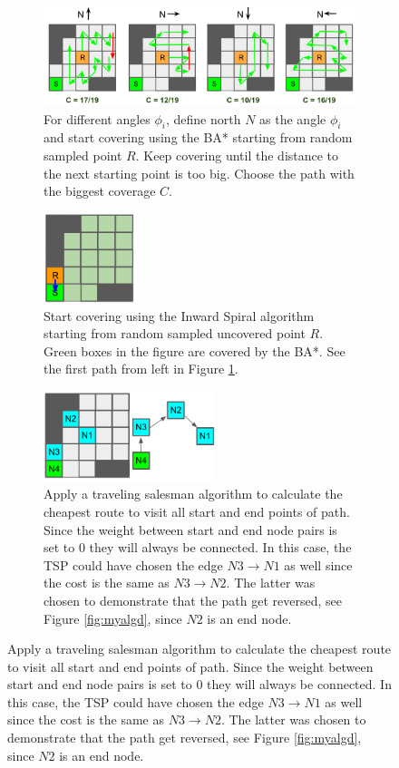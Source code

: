 \begin{figure}
\centering
    \begin{subfigure}{\textwidth}
    \centering
    \includegraphics[width=\textwidth]{figures/Sampled_BA.png}
    \caption{For different angles $\phi_i$, define north $N$ as the angle $\phi_i$ and start covering using the BA* starting from random sampled point $R$. Keep covering until the distance to the next starting point is too big. Choose the path with the biggest coverage $C$.}
    \label{fig:myalga}
    \end{subfigure}
    \begin{subfigure}{\textwidth}
    \centering
    \includegraphics[width=0.3\textwidth]{figures/Sampled_inward.png}
    \caption{Start covering using the Inward Spiral algorithm starting from random sampled uncovered point $R$. Green boxes in the figure are covered by the BA*. See the first path from left in Figure \ref{fig:myalga}.}
    \label{fig:myalgb}
    \end{subfigure}
    \begin{subfigure}{\textwidth}
    \centering
    \includegraphics[width=0.55\textwidth]{figures/Sampled_TSP.png}
    \caption{Apply a traveling salesman algorithm to calculate the cheapest route to visit all start and end points of path. Since the weight between start and end node pairs is set to 0 they will always be connected. In this case, the TSP could have chosen the edge $N3\rightarrow N1$ as well since the cost is the same as $N3\rightarrow N2$. The latter was chosen to demonstrate that the path get reversed, see Figure \ref{fig:myalgd}, since $N2$ is an end node.}

\end{subfigure}
\end{figure}
